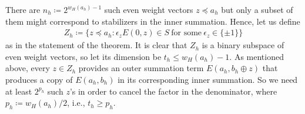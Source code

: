 \documentclass[twoside,romanappendices]{IEEEtran}
\begin{document}
There are $n_h \coloneqq 2^{w_H(a_h)-1}$ such even weight vectors $z \preceq a_h$ but only a subset of them might correspond to stabilizers in the inner summation.
Hence, let us define
\begin{align}
Z_h \coloneqq \{ z \preceq a_h \colon \epsilon_z E(0,z) \in S\ \text{for\ some}\ \epsilon_z \in \{ \pm 1 \} \}
\end{align}
as in the statement of the theorem.
It is clear that $Z_h$ is a binary subspace of even weight vectors, so let its dimension be $t_h \leq w_H(a_h) - 1$.
As mentioned above, every $z \in Z_h$ provides an outer summation term $E(a_h, b_h \oplus z)$ that produces a copy of $E(a_h,b_h)$ in its corresponding inner summation.
So we need at least $2^{p_h}$ such $z$'s in order to cancel the factor in the denominator, where $p_h \coloneqq w_H(a_h)/2$, i.e., $t_h \geq p_h$.
% 
% 
% 
\end{document}
